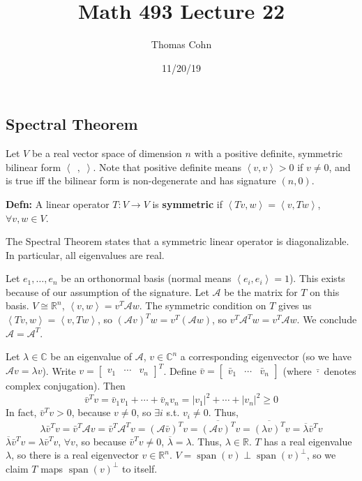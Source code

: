 \documentclass[10pt,letterpaper]{article}
\author{Thomas Cohn}
\title{Math 493 Lecture 22}
\date{11/20/19} %
\newcommand{\n}{\hfill\break}
\newcommand{\hangblock}[2]{\par\noindent\settowidth{\hangindent}{\textbf{#1: }}\textbf{#1: }\!\!\!#2}
\newcommand{\defn}[1]{\hangblock{Defn}{#1}}
\newcommand{\reals}{\mathbb{R}}
\newcommand{\R}{\reals}
\newcommand{\complex}{\mathbb{C}}
\newcommand{\C}{\complex}
\newcommand{\abs}[1]{\left|#1\right|}
\newcommand{\conj}[1]{\overline{#1}}
\newcommand{\tpose}{^{T}\!}
\newcommand{\iprod}[1]{\left<#1\right>}
\newcommand{\giprod}{\iprod{\;\,,\;}}
\DeclareMathOperator{\vspan}{span}
\newcommand{\smallBMatrix}[1]{\brack{\begin{smallmatrix}#1\end{smallmatrix}}}
\newcommand{\st}{s.t.}
\renewcommand{\brack}[1]{\left[#1\right]}
\begin{document}
\maketitle
\setlength\RaggedRightParindent{\parindent}
\RaggedRight

\subsection*{Spectral Theorem}

\par\noindent
Let $V$ be a real vector space of dimension $n$ with a positive definite, symmetric bilinear form $\giprod$. Note that positive definite means $\iprod{v,v}>0$ if $v\ne{}0$, and is true iff the bilinear form is non-degenerate and has signature $(n,0)$.\n

\defn{
	A linear operator $T:V\to{}V$ is \textbf{symmetric} if $\iprod{Tv,w}=\iprod{v,Tw}$, $\forall{}v,w\in{}V$.\n
}

\par\noindent
The Spectral Theorem states that a symmetric linear operator is diagonalizable. In particular, all eigenvalues are real.\n

\par\noindent
Let $e_{1},\ldots,e_{n}$ be an orthonormal basis (normal means $\iprod{e_{i},e_{i}}=1$). This exists because of our assumption of the signature. Let $\mathcal{A}$ be the matrix for $T$ on this basis. $V\cong\R^{n}$, $\iprod{v,w}=v\tpose{}\mathcal{A}w$. The symmetric condition on $T$ gives us $\iprod{Tv,w}=\iprod{v,Tw}$, so $(\mathcal{A}v)\tpose{}w=v\tpose(\mathcal{A}w)$, so $v\tpose{}\mathcal{A}\tpose{}w=v\tpose{}\mathcal{A}w$. We conclude $\mathcal{A}=\mathcal{A}\tpose$.\n

\par\noindent
Let $\lambda\in\C$ be an eigenvalue of $\mathcal{A}$, $v\in\C^{n}$ a corresponding eigenvector (so we have $\mathcal{A}v=\lambda{}v$).\n
Write $v=\smallBMatrix{v_{1} & \cdots & v_{n}}\tpose$. Define $\bar v=\smallBMatrix{\bar v_{1} & \cdots & \bar v_{n}}$ (where $\bar \cdot$ denotes complex conjugation). Then
\[
	\bar v\tpose{}v=\bar v_{1}v_{1}+\cdots+\bar v_{n}v_{n}=\abs{v_{1}}^{2}+\cdots+\abs{v_{n}}^{2}\ge{}0
\]
In fact, $\bar v\tpose{}v>0$, because $v\ne{}0$, so $\exists{}i$ \st{} $v_{i}\ne{}0$. Thus,
\[
	\lambda\bar v\tpose{}v=\bar v\tpose\mathcal{A}v=\bar v\tpose\mathcal{A}\tpose{}v=(\mathcal{A}\bar v)\tpose{}v=\conj{(\mathcal{A}v)\tpose}v=\conj{(\lambda{}v)\tpose}v=\conj{\lambda}\bar v\tpose{}v
\]
$\conj{\lambda}\bar v\tpose{}v=\lambda\bar v\tpose{}v$, $\forall{}v$, so because $\bar v\tpose{}v\ne{}0$, $\conj{\lambda}=\lambda$. Thus, $\lambda\in\R$. $T$ has a real eigenvalue $\lambda$, so there is a real eigenvector $v\in\R^{n}$. $V=\vspan(v)\perp\vspan(v)^{\perp}$, so we claim $T$ maps $\vspan(v)^{\perp}$ to itself.\n
\end{document}
